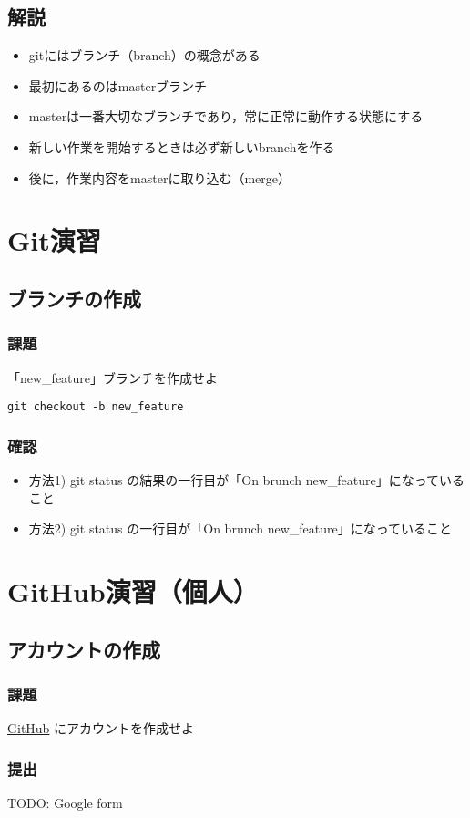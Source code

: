 \documentclass[a4paper,twoside,twocolumn]{bxjsarticle}
\begin{document}
\subsection{解説}
\label{sec-4-1}
\begin{itemize}
\item gitにはブランチ（branch）の概念がある
\item 最初にあるのはmasterブランチ
\item masterは一番大切なブランチであり，常に正常に動作する状態にする
\item 新しい作業を開始するときは必ず新しいbranchを作る
\item 後に，作業内容をmasterに取り込む（merge）
\end{itemize}
\section{Git演習}
\label{sec-5}
\subsection{ブランチの作成}
\label{sec-5-1}
\subsubsection{課題}
\label{sec-5-1-1}

「new\_feature」ブランチを作成せよ

\begin{verbatim}
git checkout -b new_feature
\end{verbatim}

\subsubsection{確認}
\label{sec-5-1-2}
\begin{itemize}
\item 方法1) git status の結果の一行目が「On brunch new\_feature」になっていること
\item 方法2) git status の一行目が「On brunch new\_feature」になっていること
\end{itemize}


\section{GitHub演習（個人）}
\label{sec-6}
\subsection{アカウントの作成}
\label{sec-6-1}
\subsubsection{課題}
\label{sec-6-1-1}
\href{https://github.com/}{GitHub} にアカウントを作成せよ
\subsubsection{提出}
\label{sec-6-1-2}
TODO: Google form
\end{document}
